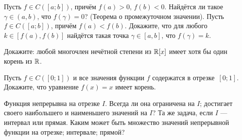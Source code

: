 \documentclass[a4paper,12pt]{article}
\begin{document}

Пусть $f\in C([a;b])$, прич\"ем
$f(a) > 0$, $f(b) <0$. Найд\"ется ли такое $\gamma\in (a,b)$, что
$f(\gamma)=0$?
{\small\sc (Теорема о промежуточном значении).}
Пусть $f\in C([a;b])$, прич\"ем  $f(a) < f(b)$.
Докажите, что для любого $k \in [f(a), f(b)]$  найд\"ется такая
точка $\gamma\in [a,b]$, что $f(\gamma) = k$.



 Докажите: любой многочлен неч\"етной степени из $\mathbb{R}[x]$
имеет хотя бы один %
корень из $\mathbb{R}$.

Пусть $f\in C([0;1])$ и все значения функции $f$ содержатся в
отрезке~$[0;1]$. Докажите, что уравнение $f(x)=x$ имеет корень.










 Функция непрерывна на отрезке $I$. Всегда ли она
 ограничена на $I$;
 достигает своего наибольшего и наименьшего значений на $I$?
 Та же задача, если $I$ --- интервал или прямая.
%
 Каким может быть множество значений непрерывной функции на
отрезке; интервале; прямой?


\end{document}
